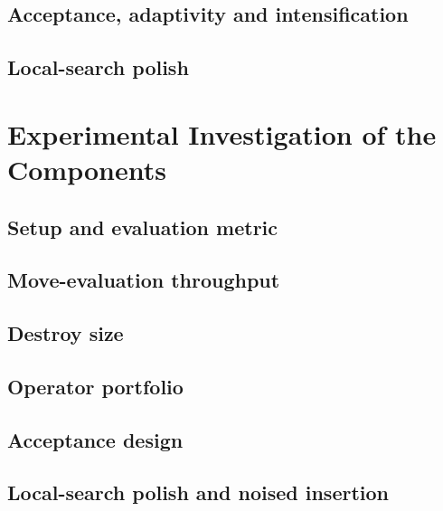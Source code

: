 \documentclass[10pt, a4paper]{article}
\begin{document}
\subsection{Acceptance, adaptivity and intensification}
\subsection{Local-search polish}

\section{Experimental Investigation of the Components}
\subsection{Setup and evaluation metric}
\subsection{Move-evaluation throughput}
\subsection{Destroy size}
\subsection{Operator portfolio}
\subsection{Acceptance design}
\subsection{Local-search polish and noised insertion}
\end{document}
